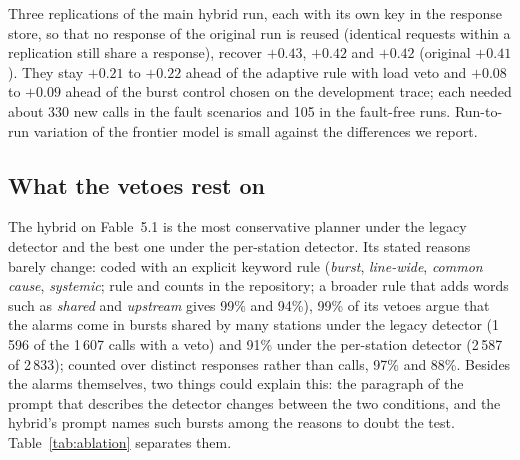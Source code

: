 \documentclass[preprint,11pt]{elsarticle}
\begin{document}
Three replications of the main hybrid run, each with its own key in the response store, so that no response of the original run is reused (identical requests within a replication still share a response), recover $+0.43$, $+0.42$ and $+0.42$ (original $+0.41$). They stay $+0.21$ to $+0.22$ ahead of the adaptive rule with load veto and $+0.08$ to $+0.09$ ahead of the burst control chosen on the development trace; each needed about 330 new calls in the fault scenarios and 105 in the fault-free runs. Run-to-run variation of the frontier model is small against the differences we report.

\subsection{What the vetoes rest on}
\label{sec:vetoes}
The hybrid on Fable~5.1 is the most conservative planner under the legacy detector and the best one under the per-station detector. Its stated reasons barely change: coded with an explicit keyword rule (\emph{burst}, \emph{line-wide}, \emph{common cause}, \emph{systemic}; rule and counts in the repository; a broader rule that adds words such as \emph{shared} and \emph{upstream} gives 99\% and 94\%), 99\% of its vetoes argue that the alarms come in bursts shared by many stations under the legacy detector (1\,596 of the 1\,607 calls with a veto) and 91\% under the per-station detector (2\,587 of 2\,833); counted over distinct responses rather than calls, 97\% and 88\%. Besides the alarms themselves, two things could explain this: the paragraph of the prompt that describes the detector changes between the two conditions, and the hybrid's prompt names such bursts among the reasons to doubt the test. Table~\ref{tab:ablation} separates them.
\end{document}
